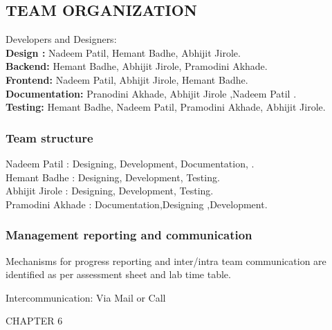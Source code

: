 \documentclass[12pt,a4paper]
{article}
\numberwithin{table}{section}
\begin{document}
{{{{{\subsection{TEAM ORGANIZATION}

Developers and Designers: \\
		\textbf{Design : }	Nadeem Patil, Hemant Badhe, Abhijit Jirole. \\
		\textbf{Backend:}	Hemant Badhe, Abhijit Jirole, Pramodini Akhade. \\
		\textbf{Frontend:}	Nadeem Patil, Abhijit Jirole, Hemant Badhe. \\
		\textbf{Documentation:}	Pranodini Akhade, Abhijit Jirole ,Nadeem Patil . \\
		\textbf{Testing:}	Hemant Badhe, Nadeem Patil, Pramodini Akhade, Abhijit Jirole. \\
\newpage
\subsubsection{Team structure}

	Nadeem Patil	:	Designing, Development, Documentation, . \\
	Hemant Badhe	:	Designing, Development, Testing. \\
	Abhijit Jirole	:	Designing, Development, Testing. \\
	Pramodini Akhade :	Documentation,Designing ,Development.

\subsubsection{Management reporting and communication}

Mechanisms for progress reporting and inter/intra team communication are identified as per assessment sheet and lab time table. 

Intercommunication:	Via Mail or Call










\newpage
\begin{minipage}{15cm}


\vspace{4 in}
 \begin{center} 
\begin{Huge}
CHAPTER 6


\end{Huge}
\end{center}
\end{minipage}}}}}}
\end{document}

